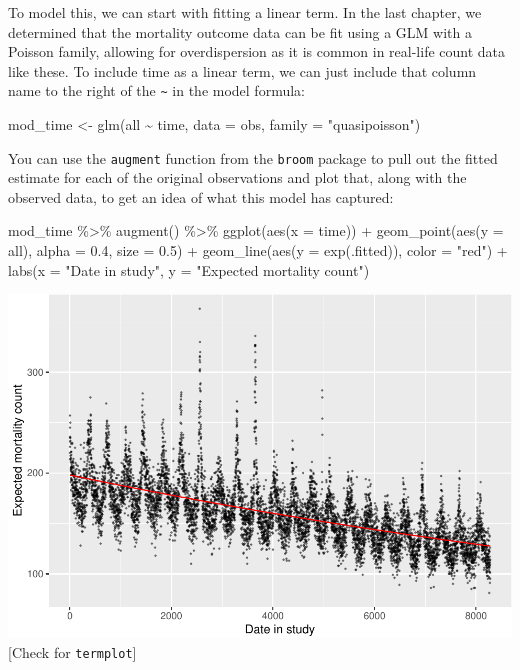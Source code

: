 \documentclass[
]{book}
\newenvironment{Shaded}{\begin{snugshade}}{\end{snugshade}}
\newcommand{\AttributeTok}[1]{\textcolor[rgb]{0.77,0.63,0.00}{#1}}
\newcommand{\FloatTok}[1]{\textcolor[rgb]{0.00,0.00,0.81}{#1}}
\newcommand{\FunctionTok}[1]{\textcolor[rgb]{0.00,0.00,0.00}{#1}}
\newcommand{\NormalTok}[1]{#1}
\newcommand{\OtherTok}[1]{\textcolor[rgb]{0.56,0.35,0.01}{#1}}
\newcommand{\SpecialCharTok}[1]{\textcolor[rgb]{0.00,0.00,0.00}{#1}}
\newcommand{\StringTok}[1]{\textcolor[rgb]{0.31,0.60,0.02}{#1}}
\begin{document}
To model this, we can start with fitting a linear term. In the last chapter,
we determined that the mortality outcome data can be fit using a GLM with a
Poisson family, allowing for overdispersion as it is common in real-life
count data like these. To include time as a linear term, we can just include
that column name to the right of the \texttt{\textasciitilde{}} in the model formula:

\begin{Shaded}
\begin{Highlighting}[]
\NormalTok{mod\_time }\OtherTok{\textless{}{-}} \FunctionTok{glm}\NormalTok{(all }\SpecialCharTok{\textasciitilde{}}\NormalTok{ time, }
                \AttributeTok{data =}\NormalTok{ obs, }\AttributeTok{family =} \StringTok{"quasipoisson"}\NormalTok{)}
\end{Highlighting}
\end{Shaded}

You can use the \texttt{augment} function from the \texttt{broom} package to pull out the
fitted estimate for each of the original observations and plot that, along
with the observed data, to get an idea of what this model has captured:

\begin{Shaded}
\begin{Highlighting}[]
\NormalTok{mod\_time }\SpecialCharTok{\%\textgreater{}\%} 
  \FunctionTok{augment}\NormalTok{() }\SpecialCharTok{\%\textgreater{}\%} 
  \FunctionTok{ggplot}\NormalTok{(}\FunctionTok{aes}\NormalTok{(}\AttributeTok{x =}\NormalTok{ time)) }\SpecialCharTok{+} 
  \FunctionTok{geom\_point}\NormalTok{(}\FunctionTok{aes}\NormalTok{(}\AttributeTok{y =}\NormalTok{ all), }\AttributeTok{alpha =} \FloatTok{0.4}\NormalTok{, }\AttributeTok{size =} \FloatTok{0.5}\NormalTok{) }\SpecialCharTok{+} 
  \FunctionTok{geom\_line}\NormalTok{(}\FunctionTok{aes}\NormalTok{(}\AttributeTok{y =} \FunctionTok{exp}\NormalTok{(.fitted)), }\AttributeTok{color =} \StringTok{"red"}\NormalTok{) }\SpecialCharTok{+} 
  \FunctionTok{labs}\NormalTok{(}\AttributeTok{x =} \StringTok{"Date in study"}\NormalTok{, }\AttributeTok{y =} \StringTok{"Expected mortality count"}\NormalTok{) }
\end{Highlighting}
\end{Shaded}

\includegraphics{adv_epi_analysis_files/figure-latex/unnamed-chunk-49-1.pdf}
{[}Check for \texttt{termplot}{]}
\end{document}
